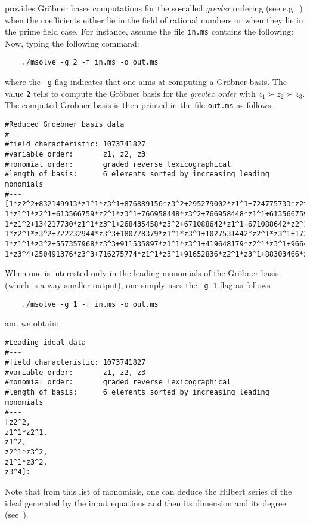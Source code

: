 \documentclass[a4paper,english,11pt]{scrartcl}
\theoremstyle{definition}
\theoremstyle{remark}
\begin{document}
\msolve provides Gr\"obner bases computations for the so-called \emph{grevlex}
ordering (see e.g.~\cite{CLO}) when the coefficients either lie in the field of
rational numbers or when they lie in the prime field case. For instance, assume
the file \verb+in.ms+ contains the following:
 Now, typing the following
command:
\begin{tcolorbox} %
  \begin{verbatim}
    ./msolve -g 2 -f in.ms -o out.ms 
  \end{verbatim}
\end{tcolorbox}
where the \verb+-g+ flag indicates that one aims at computing a Gr\"obner
basis. The value \verb+2+ tells \msolve to compute the Gr\"obner basis for the
\emph{grevlex order} with $z_1\succ z_2 \succ z_3 $. The computed Gr\"obner basis
is then printed in the file \verb+out.ms+ as follows.
\begin{tcolorbox} %
  \begin{lstlisting}
#Reduced Groebner basis data
#---
#field characteristic: 1073741827
#variable order:       z1, z2, z3
#monomial order:       graded reverse lexicographical
#length of basis:      6 elements sorted by increasing leading monomials
#---
[1*z2^2+832149913*z1^1*z3^1+876889156*z3^2+295279002*z1^1+724775733*z2^1+143165573*z3^1,
1*z1^1*z2^1+613566759*z2^1*z3^1+766958448*z3^2+766958448*z1^1+613566759*z3^1+153391691,
1*z1^2+134217730*z1^1*z3^1+268435458*z3^2+671088642*z1^1+671088642*z2^1,
1*z2^1*z3^2+722232944*z3^3+180778379*z1^1*z3^1+1027531442*z2^1*z3^1+173735741*z3^2+936498976*z1^1+702034498*z2^1+921316952*z3^1+59915395,
1*z1^1*z3^2+557357968*z3^3+911535897*z1^1*z3^1+419648179*z2^1*z3^1+96648475*z3^2+698659259*z1^1+282295066*z2^1+885328953*z3^1+769127629,
1*z3^4+250491376*z3^3+716275774*z1^1*z3^1+91652836*z2^1*z3^1+88303466*z3^2+855797860*z1^1+18642214*z2^1+728901227*z3^1+969918485]:
  \end{lstlisting}
\end{tcolorbox}
When one is interested only in the leading monomials of the Gr\"obner basis
(which is a way smaller output), one simply uses the \verb+-g 1+ flag as follows
\begin{tcolorbox} %
  \begin{verbatim}
    ./msolve -g 1 -f in.ms -o out.ms 
  \end{verbatim}
\end{tcolorbox}
and we obtain:
\begin{tcolorbox} %
  \begin{lstlisting}
#Leading ideal data
#---
#field characteristic: 1073741827
#variable order:       z1, z2, z3
#monomial order:       graded reverse lexicographical
#length of basis:      6 elements sorted by increasing leading monomials
#---
[z2^2,
z1^1*z2^1,
z1^2,
z2^1*z3^2,
z1^1*z3^2,
z3^4]:
  \end{lstlisting}
\end{tcolorbox}
Note that from this list of monomials, one can deduce the Hilbert series of the
ideal generated by the input equations and then its dimension and its degree
(see~\cite{CLO}).
\end{document}
